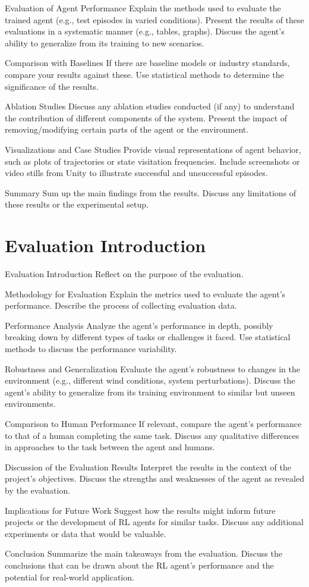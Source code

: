 Evaluation of Agent Performance
Explain the methods used to evaluate the trained agent (e.g., test episodes in varied conditions).
Present the results of these evaluations in a systematic manner (e.g., tables, graphs).
Discuss the agent’s ability to generalize from its training to new scenarios.

Comparison with Baselines
If there are baseline models or industry standards, compare your results against these.
Use statistical methods to determine the significance of the results.

Ablation Studies
Discuss any ablation studies conducted (if any) to understand the contribution of different components of the system.
Present the impact of removing/modifying certain parts of the agent or the environment.

Visualizations and Case Studies
Provide visual representations of agent behavior, such as plots of trajectories or state visitation frequencies.
Include screenshots or video stills from Unity to illustrate successful and unsuccessful episodes.

Summary
Sum up the main findings from the results.
Discuss any limitations of these results or the experimental setup.


\section{Evaluation Introduction}
Evaluation
Introduction
Reflect on the purpose of the evaluation.

Methodology for Evaluation
Explain the metrics used to evaluate the agent’s performance.
Describe the process of collecting evaluation data.

Performance Analysis
Analyze the agent’s performance in depth, possibly breaking down by different types of tasks or challenges it faced.
Use statistical methods to discuss the performance variability.

Robustness and Generalization
Evaluate the agent's robustness to changes in the environment (e.g., different wind conditions, system perturbations).
Discuss the agent's ability to generalize from its training environment to similar but unseen environments.

Comparison to Human Performance
If relevant, compare the agent’s performance to that of a human completing the same task.
Discuss any qualitative differences in approaches to the task between the agent and humans.

Discussion of the Evaluation Results
Interpret the results in the context of the project's objectives.
Discuss the strengths and weaknesses of the agent as revealed by the evaluation.

Implications for Future Work
Suggest how the results might inform future projects or the development of RL agents for similar tasks.
Discuss any additional experiments or data that would be valuable.

Conclusion
Summarize the main takeaways from the evaluation.
Discuss the conclusions that can be drawn about the RL agent's performance and the potential for real-world application.